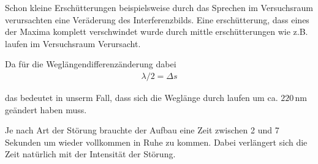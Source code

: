 
Schon kleine Erschütterungen beispielsweise durch das Sprechen im Versuchsraum verursachten eine Veräderung des Interferenzbilds. Eine erschütterung, dass eines der Maxima komplett verschwindet wurde durch mittle erschütterungen wie z.B. laufen im Versuchsraum Verursacht.

Da für die Weglängendifferenzänderung dabei
\begin{align}
  \lambda / 2 = \Delta s
\end{align}

das bedeutet in unserm Fall, dass sich die Weglänge durch laufen um ca. $220\, \text{nm}$ geändert haben muss.

Je nach Art der Störung brauchte der Aufbau eine Zeit zwischen 2 und 7 Sekunden um wieder vollkommen in Ruhe zu kommen. Dabei verlängert sich die Zeit natürlich mit der Intensität der Störung.
